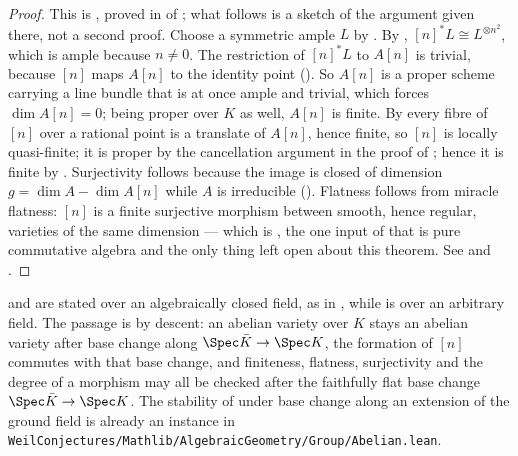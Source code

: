 \begin{proof}
This is , proved in  of
; what follows is a sketch of the argument given there, not a
second proof.  Choose a symmetric ample $L$ by
.  By ,
$[n]^*L\cong L^{\otimes n^2}$, which is ample because $n$.  The
restriction of $[n]^*L$ to $A[n]$ is trivial, because $[n]$ maps $A[n]$ to the
identity point ().  So $A[n]$ is a proper scheme
carrying a line bundle that is at once ample and trivial, which forces
$\dim A[n]=0$; being proper over $K$ as well, $A[n]$ is finite.  By
 every fibre of $[n]$ over a rational
point is a translate of $A[n]$, hence finite, so $[n]$ is locally
quasi-finite; it is proper by the cancellation argument in the proof of
; hence it is finite by
.  Surjectivity follows because the image is closed
of dimension $g=\dim A-\dim A[n]$ while $A$ is irreducible
().  Flatness follows from miracle flatness: $[n]$ is a
finite surjective morphism between smooth, hence regular, varieties of the same
dimension --- which is , the one input of
 that is pure commutative algebra and the only thing left open
about this theorem.  See \cite[\S6]{MumfordAbelianVarieties} and
\cite[I, \S7]{MilneAbelianVarieties}.
\end{proof}

\begin{remark}
\label{rem:av-descent-to-any-field}
 and  are stated over
an algebraically closed field, as in \cite[\S6]{MumfordAbelianVarieties}, while
 is over an arbitrary field.  The passage is by descent:
an abelian variety over $K$ stays an abelian variety after base change along
$\Spec\bar K\to\Spec K$, the formation of $[n]$ commutes with that base change,
and finiteness, flatness, surjectivity and the degree of a morphism may all be
checked after the faithfully flat base change $\Spec\bar K\to\Spec K$.  The
stability of  under base change along an extension
of the ground field is already an instance in
\texttt{WeilConjectures/Mathlib/AlgebraicGeometry/Group/Abelian.lean}.
\end{remark}

